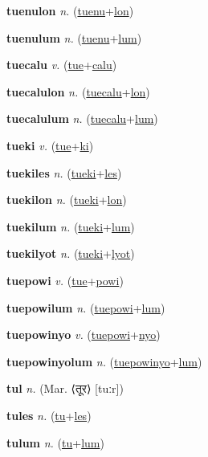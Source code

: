 \textbf{\hypertarget{tuenulon}{tuenulon}} \textit{n.} (\hyperlink{tuenu}{tuenu}+\allowbreak \hyperlink{lon}{lon})


\textbf{\hypertarget{tuenulum}{tuenulum}} \textit{n.} (\hyperlink{tuenu}{tuenu}+\allowbreak \hyperlink{lum}{lum})


\textbf{\hypertarget{tuecalu}{tuecalu}} \textit{v.} (\hyperlink{tue}{tue}+\allowbreak \hyperlink{calu}{calu})


\textbf{\hypertarget{tuecalulon}{tuecalulon}} \textit{n.} (\hyperlink{tuecalu}{tuecalu}+\allowbreak \hyperlink{lon}{lon})


\textbf{\hypertarget{tuecalulum}{tuecalulum}} \textit{n.} (\hyperlink{tuecalu}{tuecalu}+\allowbreak \hyperlink{lum}{lum})


\textbf{\hypertarget{tueki}{tueki}} \textit{v.} (\hyperlink{tue}{tue}+\allowbreak \hyperlink{ki}{ki})


\textbf{\hypertarget{tuekiles}{tuekiles}} \textit{n.} (\hyperlink{tueki}{tueki}+\allowbreak \hyperlink{les}{les})


\textbf{\hypertarget{tuekilon}{tuekilon}} \textit{n.} (\hyperlink{tueki}{tueki}+\allowbreak \hyperlink{lon}{lon})


\textbf{\hypertarget{tuekilum}{tuekilum}} \textit{n.} (\hyperlink{tueki}{tueki}+\allowbreak \hyperlink{lum}{lum})


\textbf{\hypertarget{tuekilyot}{tuekilyot}} \textit{n.} (\hyperlink{tueki}{tueki}+\allowbreak \hyperlink{lyot}{lyot})


\textbf{\hypertarget{tuepowi}{tuepowi}} \textit{v.} (\hyperlink{tue}{tue}+\allowbreak \hyperlink{powi}{powi})


\textbf{\hypertarget{tuepowilum}{tuepowilum}} \textit{n.} (\hyperlink{tuepowi}{tuepowi}+\allowbreak \hyperlink{lum}{lum})


\textbf{\hypertarget{tuepowinyo}{tuepowinyo}} \textit{v.} (\hyperlink{tuepowi}{tuepowi}+\allowbreak \hyperlink{nyo}{nyo})


\textbf{\hypertarget{tuepowinyolum}{tuepowinyolum}} \textit{n.} (\hyperlink{tuepowinyo}{tuepowinyo}+\allowbreak \hyperlink{lum}{lum})


\textbf{\hypertarget{tul}{tul}} \textit{n.} (Mar. ⟨{\devanagari{}तूर}⟩ [tuːr])


\textbf{\hypertarget{tules}{tules}} \textit{n.} (\hyperlink{tu}{tu}+\allowbreak \hyperlink{les}{les})


\textbf{\hypertarget{tulum}{tulum}} \textit{n.} (\hyperlink{tu}{tu}+\allowbreak \hyperlink{lum}{lum})


